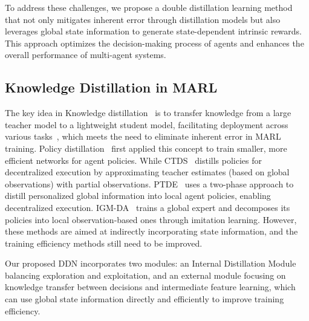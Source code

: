 To address these challenges, we propose a double distillation learning method that not only mitigates inherent error through distillation models but also leverages global state information to generate state-dependent intrinsic rewards. This approach optimizes the decision-making process of agents and enhances the overall performance of multi-agent systems.

\subsection{Knowledge Distillation in MARL}
The key idea in Knowledge distillation~\cite{hinton2015distillingknowledgeneuralnetwork} is to transfer knowledge from a large teacher model to a lightweight student model, facilitating deployment across various tasks~\cite{gou2021knowledge,wang2021knowledge,xu2024survey}, which meets the need to eliminate inherent error in MARL training. Policy distillation~\cite{rusu2015policy} first applied this concept to train smaller, more efficient networks for agent policies. While CTDS~\cite{zhao2022ctds} distills policies for decentralized execution by approximating teacher estimates (based on global observations) with partial observations. PTDE~\cite{ijcai2024p0004} uses a two-phase approach to distill personalized global information into local agent policies, enabling decentralized execution. IGM-DA~\cite{hong2022rethinking} trains a global expert and decomposes its policies into local observation-based ones through imitation learning. However, these methods are aimed at indirectly incorporating state information, and the training efficiency methods still need to be improved.

Our proposed DDN incorporates two modules: an Internal Distillation Module balancing exploration and exploitation, and an external module focusing on knowledge transfer between decisions and intermediate feature learning, which can use global state information directly and efficiently to improve training efficiency.